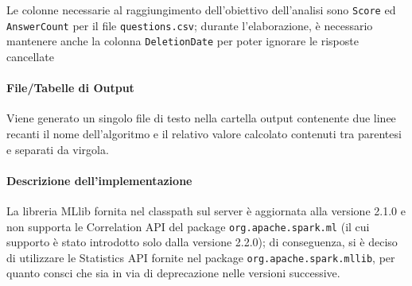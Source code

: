   Le colonne necessarie al raggiungimento dell'obiettivo dell'analisi sono \texttt{Score} ed \texttt{AnswerCount} per il file \texttt{questions.csv};
  durante l'elaborazione, è necessario mantenere anche la colonna \texttt{DeletionDate} per poter ignorare le risposte cancellate

  \paragraph{File/Tabelle di Output}\label{par:job3:output}

  Viene generato un singolo file di testo nella cartella output contenente due linee recanti il nome dell'algoritmo e il relativo valore calcolato contenuti tra parentesi e separati da virgola.

  \paragraph{Descrizione dell'implementazione}\label{par:job3:implementation}

  La libreria MLlib fornita nel classpath sul server è aggiornata alla versione 2.1.0 e non supporta le Correlation API del package \texttt{org.apache.spark.ml} (il cui supporto è stato introdotto solo dalla versione 2.2.0);
  di conseguenza, si è deciso di utilizzare le Statistics API fornite nel package \texttt{org.apache.spark.mllib}, per quanto consci che sia in via di deprecazione nelle versioni successive.

